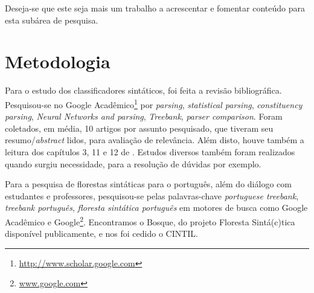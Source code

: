Deseja-se que este seja mais um trabalho a acrescentar e fomentar conteúdo para esta subárea de pesquisa.


\section{Metodologia}\label{sec:metodologia}



Para o estudo dos classificadores sintáticos, foi feita a revisão bibliográfica. Pesquisou-se no Google Acadêmico\footnote{\url{http://www.scholar.google.com}} por \textit{parsing}, \textit{statistical parsing}, \textit{constituency parsing}, \textit{Neural Networks and parsing}, \textit{Treebank}, \textit{parser comparison}. Foram coletados, em média, 10 artigos por assunto pesquisado, que tiveram seu resumo/\textit{abstract} lidos, para avaliação de relevância. Além disto, houve também a leitura dos capítulos 3, 11 e 12 de \cite{Manning1999FoundationsNLP}. Estudos diversos também foram realizados quando surgiu necessidade, para a resolução de dúvidas por exemplo.

Para a pesquisa de florestas sintáticas para o português, além do diálogo com estudantes e professores, pesquisou-se pelas palavras-chave \textit{portuguese treebank}, \textit{treebank português}, \textit{floresta sintática português} em motores de busca como Google Acadêmico e Google\footnote{\url{www.google.com}}. Encontramos o Bosque, do projeto Floresta Sintá(c)tica disponível publicamente, e nos foi cedido o CINTIL.

